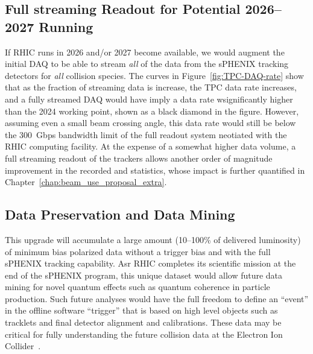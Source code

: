 

\subsection{Full streaming Readout for Potential 2026--2027 Running}

If RHIC runs in 2026 and/or 2027 become available, we would augment
the initial DAQ to be able to stream \emph{all} of the data from the
sPHENIX tracking detectors for \emph{all} collision species.  The
curves in Figure~\ref{fig:TPC-DAQ-rate} show that as the fraction of
streaming data is increase, the TPC data rate increases, and a fully
streamed DAQ would have imply a data rate wsignificantly higher than
the 2024 working point, shown as a black diamond in the figure.
However, assuming even a small beam crossing angle, this data rate
would still be below the 300~Gbps bandwidth limit of the full readout
system neotiated with the RHIC computing facility.  At the expense of
a somewhat higher data volume, a full streaming readout of the
trackers allows another order of magnitude improvement in the recorded
\pp and \pA statistics, whose impact is further quantified in
Chapter~\ref{chap:beam_use_proposal_extra}.

\subsection{Data Preservation and Data Mining}

This upgrade will accumulate a large amount (10--100\% of delivered
luminosity) of minimum bias polarized \pp data without a trigger bias
and with the full sPHENIX tracking capability.  Asr RHIC completes its
scientific mission at the end of the sPHENIX program, this unique
dataset would allow future data mining for novel quantum effects such
as quantum coherence in particle production.  Such future analyses
would have the full freedom to define an ``event'' in the offline
software ``trigger'' that is based on high level objects such as
tracklets and final detector alignment and calibrations.  These \pp
data may be critical for fully understanding the future \eA collision
data at the Electron Ion Collider~\cite{Accardi2012}.
